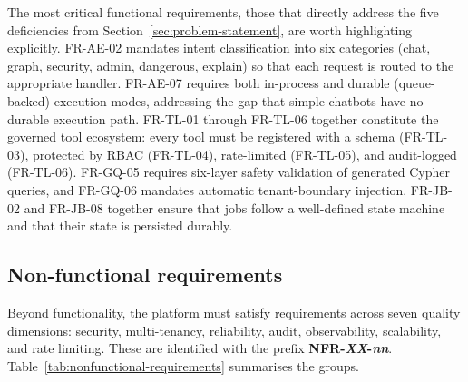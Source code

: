 \documentclass[a4paper]{sapthesis}
\begin{document}
The most critical functional requirements, those that directly address the
five deficiencies from Section~\ref{sec:problem-statement}, are worth
highlighting explicitly.  FR-AE-02 mandates intent classification into
six categories (chat, graph, security, admin, dangerous, explain) so that
each request is routed to the appropriate handler.  FR-AE-07 requires both
in-process and durable (queue-backed) execution modes, addressing the gap
that simple chatbots have no durable execution path.  FR-TL-01 through FR-TL-06
together constitute the governed tool ecosystem: every tool must be
registered with a schema (FR-TL-03), protected by RBAC (FR-TL-04),
rate-limited (FR-TL-05), and audit-logged (FR-TL-06).  FR-GQ-05 requires
six-layer safety validation of generated Cypher queries, and FR-GQ-06
mandates automatic tenant-boundary injection.  FR-JB-02 and FR-JB-08
together ensure that jobs follow a well-defined state machine and that
their state is persisted durably.

\subsection{Non-functional requirements}
\label{sec:non-functional-requirements}

Beyond functionality, the platform must satisfy requirements across seven
quality dimensions: security, multi-tenancy, reliability, audit,
observability, scalability, and rate limiting.  These are identified with the prefix
\textbf{NFR-\emph{XX}-\emph{nn}}.  Table~\ref{tab:nonfunctional-requirements}
summarises the groups.
\end{document}

